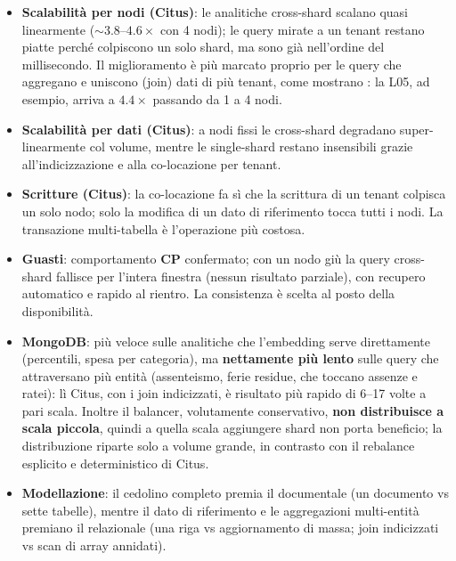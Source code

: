 \begin{itemize}
  \item \textbf{Scalabilità per nodi (Citus)}: le analitiche cross-shard scalano quasi linearmente
        (${\sim}3.8\text{--}4.6\times$ con 4 nodi); le query mirate a un tenant restano piatte perché
        colpiscono un solo shard, ma sono già nell'ordine del millisecondo. Il miglioramento è più marcato
        proprio per le query che aggregano e uniscono (join) dati di più tenant, come mostrano
        : la L05, ad esempio, arriva a $4.4\times$ passando da 1
        a 4 nodi.
  \item \textbf{Scalabilità per dati (Citus)}: a nodi fissi le cross-shard degradano super-linearmente col
        volume, mentre le single-shard restano insensibili grazie all'indicizzazione e alla co-locazione per
        tenant.
  \item \textbf{Scritture (Citus)}: la co-locazione fa sì che la scrittura di un tenant colpisca un solo nodo;
        solo la modifica di un dato di riferimento tocca tutti i nodi. La transazione multi-tabella è
        l'operazione più costosa.
  \item \textbf{Guasti}: comportamento \textbf{CP} confermato; con un nodo giù la query cross-shard
        fallisce per l'intera finestra (nessun risultato parziale), con recupero automatico e rapido al
        rientro. La consistenza è scelta al posto della disponibilità.
  \item \textbf{MongoDB}: più veloce sulle analitiche che l'embedding serve direttamente (percentili, spesa
        per categoria), ma \textbf{nettamente più lento} sulle query che attraversano più entità (assenteismo,
        ferie residue, che toccano assenze e ratei): lì Citus, con i join indicizzati, è risultato più rapido
        di 6--17 volte a pari scala. Inoltre il balancer, volutamente conservativo, \textbf{non distribuisce a
        scala piccola}, quindi a quella scala aggiungere shard non porta beneficio; la distribuzione riparte
        solo a volume grande, in contrasto con il rebalance esplicito e deterministico di Citus.
  \item \textbf{Modellazione}: il cedolino completo premia il documentale (un documento vs sette tabelle),
        mentre il dato di riferimento e le aggregazioni multi-entità premiano il relazionale (una riga vs
        aggiornamento di massa; join indicizzati vs scan di array annidati).
\end{itemize}

